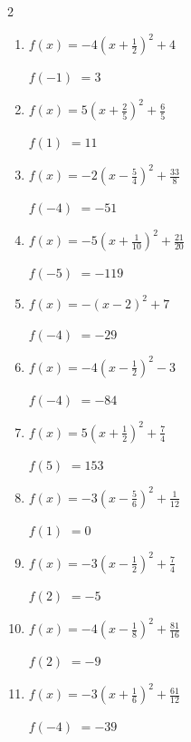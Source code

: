 \begin{multicols}{2}
\begin{enumerate}
$f(5)$
        $=110$

  \item $\displaystyle f(x)=-4\left( x+\frac{1}{2}\right)^{2}+4$

$f(-1)$
        $=3$

  \item $\displaystyle f(x)=5\left( x+\frac{2}{5}\right)^{2}+\frac{6}{5}$

$f(1)$
        $=11$

  \item $\displaystyle f(x)=-2\left( x-\frac{5}{4}\right)^{2}+\frac{33}{8}$

$f(-4)$
        $=-51$

  \item $\displaystyle f(x)=-5\left( x+\frac{1}{10}\right)^{2}+\frac{21}{20}$

$f(-5)$
        $=-119$

\columnbreak %

  \item $\displaystyle f(x)=-\left( x-2\right)^{2}+7$

$f(-4)$
        $=-29$

  \item $\displaystyle f(x)=-4\left( x-\frac{1}{2}\right)^{2}-3$

$f(-4)$
        $=-84$

  \item $\displaystyle f(x)=5\left( x+\frac{1}{2}\right)^{2}+\frac{7}{4}$

$f(5)$
        $=153$

  \item $\displaystyle f(x)=-3\left( x-\frac{5}{6}\right)^{2}+\frac{1}{12}$

$f(1)$
        $=0$

  \item $\displaystyle f(x)=-3\left( x-\frac{1}{2}\right)^{2}+\frac{7}{4}$

$f(2)$
        $=-5$

\columnbreak %

\resetques

  \item $\displaystyle f(x)=-4\left( x-\frac{1}{8}\right)^{2}+\frac{81}{16}$

$f(2)$
        $=-9$

  \item $\displaystyle f(x)=-3\left( x+\frac{1}{6}\right)^{2}+\frac{61}{12}$

$f(-4)$
        $=-39$


\end{enumerate}
\end{multicols}
